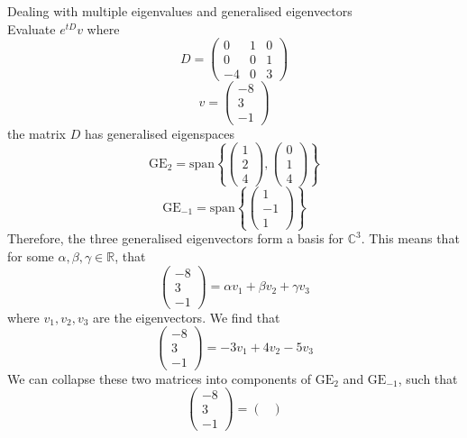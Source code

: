 \documentclass[journal, letterpaper]{IEEEtran}
\begin{document}
    \begin{myboxg}{Dealing with multiple eigenvalues and generalised eigenvectors} \\ 
        Evaluate $e^{tD}v$ where
        $$ D = \begin{pmatrix}
            0 & 1 & 0 \\
            0 & 0 & 1 \\
            -4 & 0 & 3
        \end{pmatrix}$$
        $$ v = \begin{pmatrix}
            -8 \\ 3 \\ -1
        \end{pmatrix}$$
        the matrix $D$ has generalised eigenspaces
        $$ \text{GE}_2 = \text{span}\left\{\begin{pmatrix}
        1 \\ 2 \\ 4
        \end{pmatrix}, \begin{pmatrix}
        0 \\ 1 \\ 4
        \end{pmatrix} \right\}$$
        $$ \text{GE}_{-1} = \text{span}\left\{\begin{pmatrix}
        1 \\ -1 \\ 1
        \end{pmatrix} \right\}$$
        Therefore, the three generalised eigenvectors form a basis for $\mathbb{C}^3$. This means that 
        for some $\alpha, \beta, \gamma \in \mathbb{R}$, that
        $$ \begin{pmatrix}
            -8 \\ 3 \\ -1
        \end{pmatrix} = \alpha v_1 + \beta v_2 + \gamma v_3$$
        where $v_1, v_2, v_3$ are the eigenvectors. We find that
        $$ \begin{pmatrix}
            -8 \\ 3 \\ -1
        \end{pmatrix} = -3v_1 + 4v_2 - 5v_3$$
        We can collapse these two matrices into components of $\text{GE}_2$ and $\text{GE}_{-1}$, such that
        $$ \begin{pmatrix}
            -8 \\ 3 \\ -1 
        \end{pmatrix} = \begin{pmatrix}

\end{pmatrix}$$
\end{myboxg}
\end{document}
